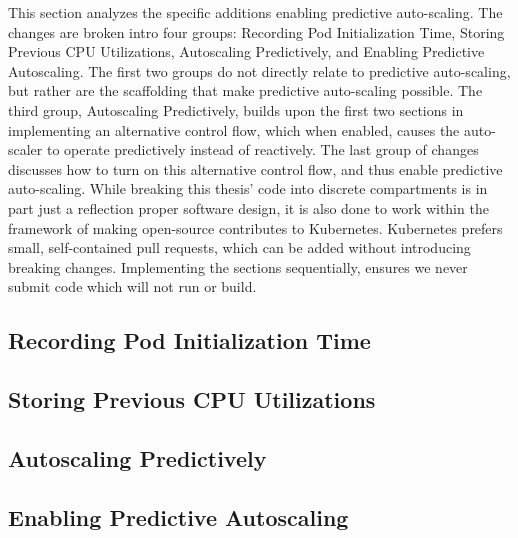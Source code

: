 This section analyzes the specific additions enabling predictive auto-scaling.
The changes are broken intro four groups: Recording Pod Initialization Time,
Storing Previous CPU Utilizations, Autoscaling Predictively, and Enabling
Predictive Autoscaling. The first two groups do not directly relate to
predictive auto-scaling, but rather are the scaffolding that make predictive
auto-scaling possible. The third group, Autoscaling Predictively, builds upon
the first two sections in implementing an alternative control flow, which when
enabled, causes the auto-scaler to operate predictively instead of reactively.
The last group of changes discusses how to turn on this alternative control
flow, and thus enable predictive auto-scaling. While breaking this thesis' code
into discrete compartments is in part just a reflection proper software design,
it is also done to work within the framework of making open-source contributes
to Kubernetes. Kubernetes prefers small, self-contained pull requests, which can
be added without introducing breaking changes. Implementing the sections sequentially, ensures
we never submit code which will not run or build.

\subsection{Recording Pod Initialization Time}



\subsection{Storing Previous CPU Utilizations}



\label{autoscaling-predictively}
\subsection{Autoscaling Predictively}



\subsection{Enabling Predictive Autoscaling}


